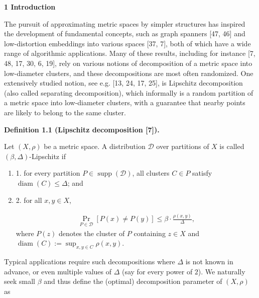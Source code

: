 \par\medskip\noindent\textbf{1 Introduction}\par
The pursuit of approximating metric spaces by simpler structures has inspired the development of fundamental concepts, such as graph spanners [47, 46] and low-distortion embeddings into various spaces [37, 7], both of which have a wide range of algorithmic applications. Many of these results, including for instance [7, 48, 17, 30, 6, 19], rely on various notions of decomposition of a metric space into low-diameter clusters, and these decompositions are most often randomized. One extensively studied notion, see e.g. [13, 24, 17, 25], is Lipschitz decomposition (also called separating decomposition), which informally is a random partition of a metric space into low-diameter clusters, with a guarantee that nearby points are likely to belong to the same cluster.
\par
\par
\par\medskip\noindent\textbf{Definition 1.1 (Lipschitz decomposition [7]).}\par
Let $(X,\rho)$ be a metric space. A distribution $\mathcal{D}$ over partitions of $X$ is called $(\beta,\Delta)$-Lipschitz if
\par
\begin{enumerate}
\item[]  1. 
for every partition $P\in\operatorname{supp}(\mathcal{D})$, all clusters $C\in P$ satisfy $\operatorname{diam}(C)\leq\Delta$; and
\par
\par
\item[]  2. 
for all $x,y\in X$,
\par
\[\begin{aligned}
\Pr_{P\in\mathcal{D}}[P(x)\neq P(y)]\leq\beta\cdot\tfrac{\rho(x,y)}{\Delta},
\end{aligned}\]
where $P(z)$ denotes the cluster of $P$ containing $z\in X$ and $\operatorname{diam}(C):=\sup_{x,y\in C}\rho(x,y)$.
\par
\par
\end{enumerate}
\par
\par
Typical applications require such decompositions where $\Delta$ is not known in advance, or even multiple values of $\Delta$ (say for every power of $2$). We naturally seek small $\beta$ and thus define the (optimal) decomposition parameter of $(X,\rho)$ as
